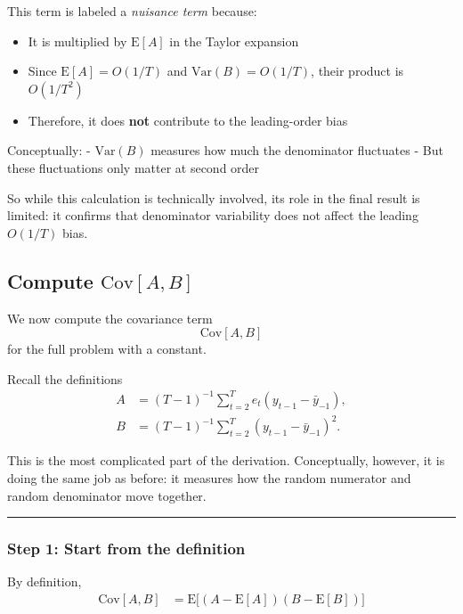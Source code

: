 \documentclass[11pt]{article}
\providecommand{\tightlist}{%
      \setlength{\itemsep}{0pt}\setlength{\parskip}{0pt}}
\begin{document}
This term is labeled a \emph{nuisance term} because:

\begin{itemize}
\tightlist
\item
  It is multiplied by \(\text{E}[A]\) in the Taylor expansion
\item
  Since \(\text{E}[A] = O(1/T)\) and \(\text{Var}(B) = O(1/T)\), their
  product is \(O(1/T^2)\)
\item
  Therefore, it does \textbf{not} contribute to the leading-order bias
\end{itemize}

Conceptually: - \(\text{Var}(B)\) measures how much the denominator
fluctuates - But these fluctuations only matter at second order

So while this calculation is technically involved, its role in the final
result is limited: it confirms that denominator variability does not
affect the leading \(O(1/T)\) bias.

    \subsection{\texorpdfstring{Compute
\(\text{Cov}[A,B]\)}{Compute \textbackslash text\{Cov\}{[}A,B{]}}}\label{compute-textcovab}

We now compute the covariance term \[
\text{Cov}[A,B]
\] for the full problem with a constant.

Recall the definitions \[
\begin{aligned}
A &= (T-1)^{-1}\sum_{t=2}^{T} e_t(y_{t-1}-\bar y_{-1}),\\
B &= (T-1)^{-1}\sum_{t=2}^{T} (y_{t-1}-\bar y_{-1})^2.
\end{aligned}
\]

This is the most complicated part of the derivation. Conceptually,
however, it is doing the same job as before: it measures how the random
numerator and random denominator move together.

\begin{center}\rule{0.5\linewidth}{0.5pt}\end{center}

\subsubsection{Step 1: Start from the
definition}\label{step-1-start-from-the-definition}

By definition, \[
\begin{aligned}
\text{Cov}[A,B]
&=\text{E}\big[(A-\text{E}[A])(B-\text{E}[B])\big]
\end{aligned}
\]
\end{document}
